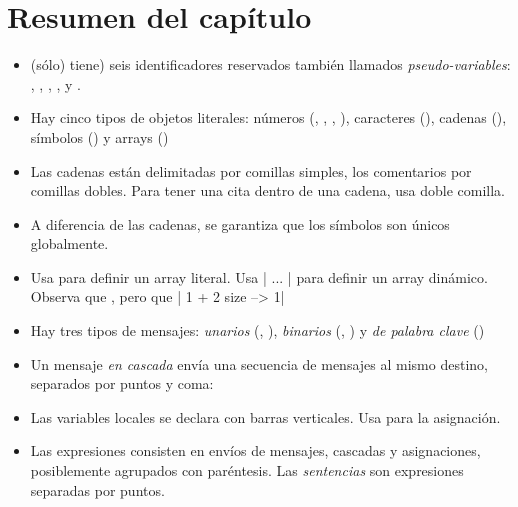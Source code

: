 \documentclass[a4paper,10pt,twoside]{book}
\begin{document}
\section{Resumen del capítulo}

\begin{itemize}

\item	\pharo (sólo) tiene) seis identificadores reservados también llamados \textit{pseudo-variables}: , , , ,  y .

\item	Hay cinco tipos de objetos literales: números (, , , ), caracteres (), cadenas (), símbolos () y arrays ()

\item	Las cadenas están delimitadas por comillas simples, los comentarios por comillas dobles.
		Para tener una cita dentro de una cadena, usa doble comilla.

\item	A diferencia de las cadenas, se garantiza que los símbolos son únicos globalmente.

\item	Usa  para definir un array literal.
		Usa \ct|{ ... }| para definir un array dinámico.
		Observa que
		, pero que
		\ct|{ 1 + 2 } size --> 1|

\item	Hay tres tipos de mensajes:
		\emph{unarios} (\eg {}, ),
		\emph{binarios} (\eg {}, ) y
		\emph{de palabra clave} (\eg {})

\item	Un mensaje \emph{en cascada} envía una secuencia de mensajes al mismo destino, separados por puntos y coma:

\item	Las variables locales se declara con barras verticales.
		Usa \ct{:=} para la asignación.

\item	Las expresiones consisten en envíos de mensajes, cascadas y asignaciones, posiblemente agrupados con paréntesis.
		Las \emph{sentencias} son expresiones separadas por puntos.


\end{itemize}
\end{document}
